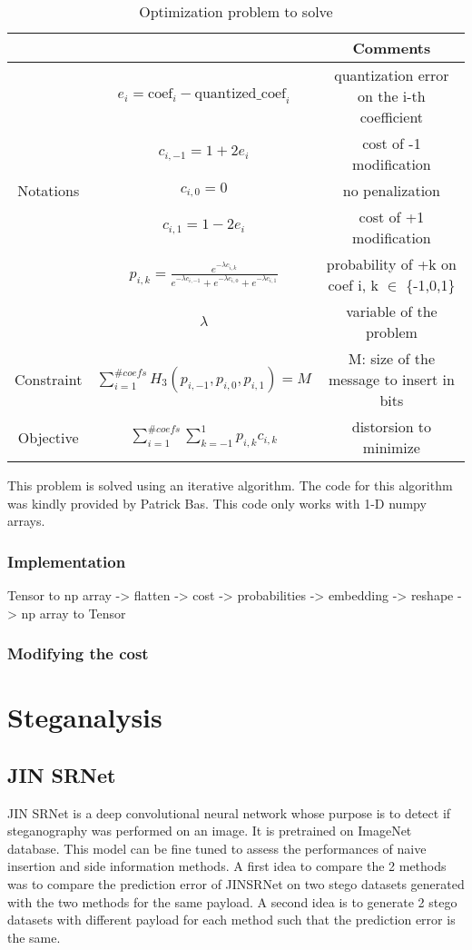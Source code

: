 \documentclass[12pt]{article}
\begin{document}
\begin{table}[H]
\begin{tabular}{ |c|c|c| }
    \hline
    &  & Comments\\
    \hline
    & $e_i = \text{coef}_i - \text{quantized\_coef}_i$ & quantization error on the i-th coefficient\\ 
    & $c_{i,-1} = 1 + 2e_i$ & cost of -1 modification\\ 
    Notations & $c_{i,0} = 0$ & no penalization\\
    & $c_{i,1} = 1 - 2e_i$ & cost of +1 modification\\
    & $p_{i,k} = \frac{e^{-\lambda c_{i,k}}}{e^{-\lambda c_{i,-1}} + e^{-\lambda c_{i,0}} + e^{-\lambda c_{i,1}}}$ & probability of +k on coef i, k $\in$ \{-1,0,1\}\\
    & $\lambda$ & variable of the problem\\
    \hline
    Constraint & $\displaystyle\sum_{i=1}^{\# coefs}{H_3(p_{i,-1},p_{i,0},p_{i,1})} = M$ & M: size of the message to insert in bits\\
    \hline
    Objective & $\displaystyle\sum_{i=1}^{\# coefs}{\sum_{k=-1}^{1}{p_{i,k}c_{i,k}}}$ & distorsion to minimize \\ 
    \hline
\end{tabular}
\caption[short]{Optimization problem to solve}
\end{table}
This problem is solved using an iterative algorithm. The code for this algorithm was kindly provided by Patrick Bas. This code only works with 1-D numpy arrays.

\subsubsection{Implementation}
Tensor to np array -> flatten -> cost -> probabilities -> embedding -> reshape -> np array to Tensor 
\subsubsection{Modifying the cost}
\section{Steganalysis}
\subsection{JIN SRNet}
JIN SRNet is a deep convolutional neural network whose purpose is to detect if steganography was performed on an image. It is pretrained on ImageNet database. This model can be fine tuned to assess the performances of naive insertion and side information methods. A first idea to compare the 2 methods was to compare the prediction error of JINSRNet on two stego datasets generated with the two methods for the same payload. A second idea is to generate 2 stego datasets with different payload for each method such that the prediction error is the same. 
\end{document}
